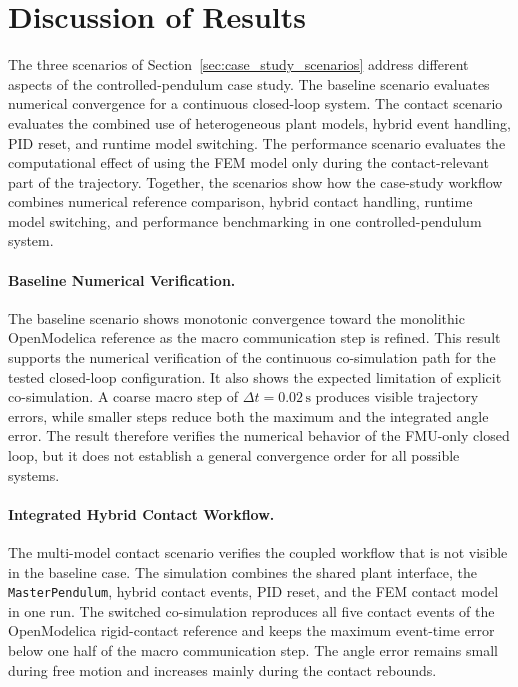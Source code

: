 \section{Discussion of Results}
\label{sec:case_study_discussion}

The three scenarios of Section~\ref{sec:case_study_scenarios} address different aspects of the controlled-pendulum case study.
The baseline scenario evaluates numerical convergence for a continuous closed-loop system.
The contact scenario evaluates the combined use of heterogeneous plant models, hybrid event handling, \ac{PID} reset, and runtime model switching.
The performance scenario evaluates the computational effect of using the \ac{FEM} model only during the contact-relevant part of the trajectory.
Together, the scenarios show how the case-study workflow combines numerical reference comparison, hybrid contact handling, runtime model switching, and performance benchmarking in one controlled-pendulum system.

\paragraph{Baseline Numerical Verification.}
The baseline scenario shows monotonic convergence toward the monolithic OpenModelica reference as the macro communication step is refined.
This result supports the numerical verification of the continuous co-simulation path for the tested closed-loop configuration.
It also shows the expected limitation of explicit co-simulation.
A coarse macro step of \(\Delta t=0.02\,\mathrm{s}\) produces visible trajectory errors, while smaller steps reduce both the maximum and the integrated angle error.
The result therefore verifies the numerical behavior of the \ac{FMU}-only closed loop, but it does not establish a general convergence order for all possible systems.

\paragraph{Integrated Hybrid Contact Workflow.}
The multi-model contact scenario verifies the coupled workflow that is not visible in the baseline case.
The simulation combines the shared plant interface, the \texttt{MasterPendulum}, hybrid contact events, \ac{PID} reset, and the \ac{FEM} contact model in one run.
The switched co-simulation reproduces all five contact events of the OpenModelica rigid-contact reference and keeps the maximum event-time error below one half of the macro communication step.
The angle error remains small during free motion and increases mainly during the contact rebounds.

